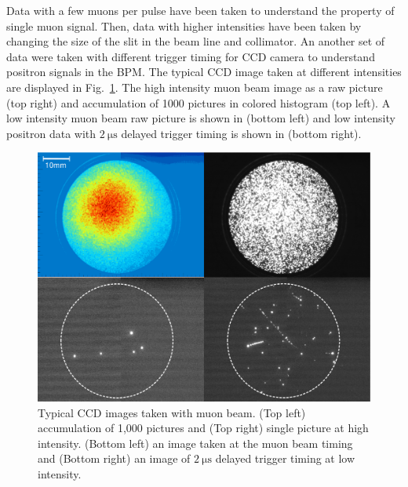 \documentclass[preprint,3p,twocolumn]{elsarticle}
\begin{document}
Data with a few muons per pulse have been taken to understand the property of single muon signal.
Then, data with higher intensities have been taken by changing the size of the slit in the beam line and collimator. 
An another set of data were taken with different trigger timing for CCD camera to understand positron signals in the BPM. %
The typical CCD image taken at different intensities are displayed in Fig.~\ref{fig:single_cluster}. The high intensity muon beam image as a raw picture (top right) and accumulation of 1000 pictures in colored histogram (top left). A low intensity muon beam raw picture is shown in (bottom left) and low intensity positron data with $\SI{2}{\micro\s}$ delayed trigger timing is shown in (bottom right).
\begin{figure}[tbp]
	\centering
	\includegraphics[width=\columnwidth]{figure/fig3_v2.pdf}
	\caption{Typical CCD images taken with muon beam. (Top left) accumulation of 1,000 pictures and (Top right) single picture at high intensity.  (Bottom left) an image taken at the muon beam timing and (Bottom right) an image of $\SI{2}{\micro\s}$ delayed trigger timing at low intensity.
	}
	\vspace{-0.4cm}
	\label{fig:single_cluster}
\end{figure}
\end{document}
